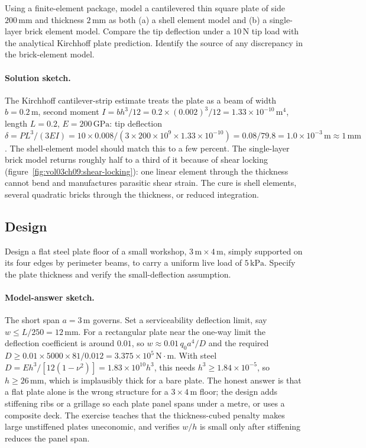 \begin{exercise}
Using a finite-element package, model a cantilevered thin square
plate of side $200\,\si{\milli\meter}$ and thickness $2\,\si{
\milli\meter}$ as both (a) a shell element model and (b) a
single-layer brick element model. Compare the tip deflection
under a $10\,\text{N}$ tip load with the analytical Kirchhoff
plate prediction. Identify the source of any discrepancy in the
brick-element model.

\paragraph{Solution sketch.} The Kirchhoff cantilever-strip estimate
treats the plate as a beam of width $b = 0.2\,\si{\meter}$, second
moment $I = bh^3/12 = 0.2\times (0.002)^3/12 = 1.33\times 10^{-10}\,
\text{m}^4$, length $L = 0.2$, $E = 200\,\text{GPa}$: tip deflection
$\delta = PL^3/(3EI) = 10\times 0.008/(3\times 200\times 10^9\times
1.33\times 10^{-10}) = 0.08/79.8 = 1.0\times 10^{-3}\,\text{m}\approx
1\,\si{\milli\meter}$. The shell-element model should match this to a
few percent. The single-layer brick model returns roughly half to a
third of it because of shear locking
(figure~\ref{fig:vol03ch09:shear-locking}): one linear element through
the thickness cannot bend and manufactures parasitic shear strain. The
cure is shell elements, several quadratic bricks through the thickness,
or reduced integration.
\end{exercise}

\subsection*{Design}

\begin{exercise}
Design a flat steel plate floor of a small workshop, $3\,\si{
\meter} \times 4\,\si{\meter}$, simply supported on its four
edges by perimeter beams, to carry a uniform live load of $5\,
\text{kPa}$. Specify the plate thickness and verify the
small-deflection assumption.

\paragraph{Model-answer sketch.} The short span $a = 3\,\si{\meter}$
governs. Set a serviceability deflection limit, say $w \le L/250 =
12\,\si{\milli\meter}$. For a rectangular plate near the one-way limit
the deflection coefficient is around $0.01$, so $w \approx 0.01\,q_0
a^4/D$ and the required $D \ge 0.01\times 5000\times 81/0.012 = 3.375\times
10^5\,\text{N}\cdot\text{m}$. With steel $D = Eh^3/[12(1-\nu^2)] =
1.83\times 10^{10}h^3$, this needs $h^3 \ge 1.84\times 10^{-5}$, so
$h \ge 26\,\si{\milli\meter}$, which is implausibly thick for a bare
plate. The honest answer is that a flat plate alone is the wrong
structure for a $3\times 4\,\si{\meter}$ floor; the design adds
stiffening ribs or a grillage so each plate panel spans under a metre,
or uses a composite deck. The exercise teaches that the thickness-cubed
penalty makes large unstiffened plates uneconomic, and verifies $w/h$
is small only after stiffening reduces the panel span.
\end{exercise}

